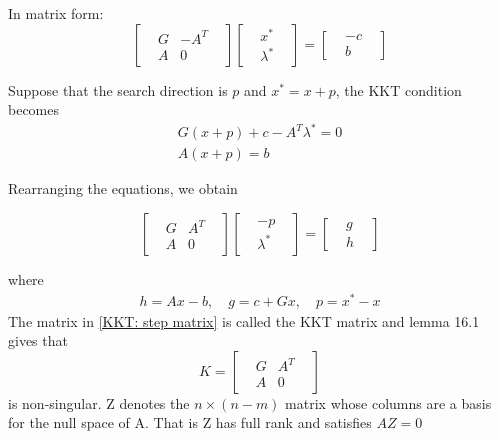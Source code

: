     In matrix form:
    \[
        \begin{bmatrix}
            &G & -A^T& \\
            &A & 0&
        \end{bmatrix}
        \begin{bmatrix}
            &x^*&\\
            &\lambda^*&
        \end{bmatrix} =
        \begin{bmatrix}
            &-c&\\
            &b&
        \end{bmatrix}\tag{16.4} \label{KKT: original matrix}
    \]

    Suppose that the search direction is $p$ and $x^* = x + p $, the KKT condition becomes
    \begin{align*}
        G(x + p) + c - A^T\lambda^* = 0\\
        A(x + p) = b
    \end{align*}

    Rearranging the equations, we obtain

    \[
        \begin{bmatrix}
            &G & A^T& \\
            &A & 0&
        \end{bmatrix}
        \begin{bmatrix}
            &-p&\\
            &\lambda^*&
        \end{bmatrix} =
        \begin{bmatrix}
            &g&\\
            &h&
        \end{bmatrix}\tag{16.5} \label{KKT: step matrix}
    \]

    where
    \begin{align}
        h = Ax -b,  \quad g = c + Gx, \quad p = x^* - x \tag{16.6}\label{KKT: transform}
    \end{align}
    The matrix in \eqref{KKT: step matrix} is called the KKT matrix and lemma 16.1 gives that
    \[
        K =
        \begin{bmatrix}
            &G & A^T& \\
            &A & 0&
        \end{bmatrix}
    \]
    is non-singular.
    Z denotes the $n\times(n -m)$ matrix whose columns are a basis for the null space of A. That is
    Z has full rank and satisfies $AZ = 0$

